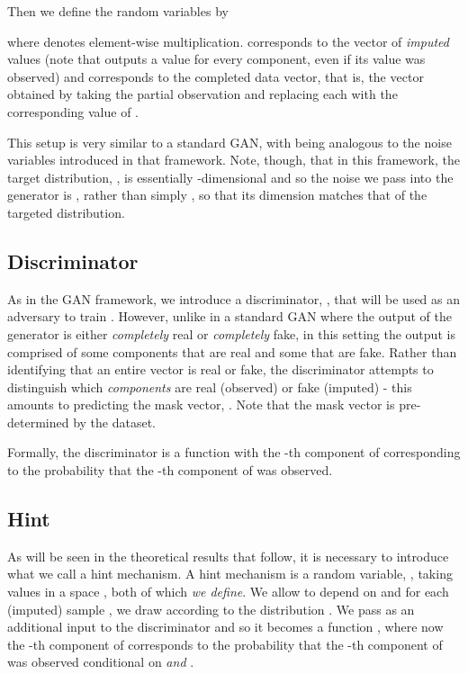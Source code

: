 \documentclass{article}
\begin{document}
Then we define the random variables  by

where  denotes element-wise multiplication.  corresponds to the vector of {\em imputed} values (note that  outputs a value for every component, even if its value was observed) and  corresponds to the completed data vector, that is, the vector obtained by taking the partial observation  and replacing each  with the corresponding value of .

This setup is very similar to a standard GAN, with  being analogous to the noise variables introduced in that framework. Note, though, that in this framework, the target distribution, , is essentially -dimensional and so the noise we pass into the generator is , rather than simply , so that its dimension matches that of the targeted distribution.

\subsection{Discriminator}
As in the GAN framework, we introduce a discriminator, , that will be used as an adversary to train . However, unlike in a standard GAN where the output of the generator is either {\em completely} real or {\em completely} fake, in this setting the output is comprised of some components that are real and some that are fake. Rather than identifying that an entire vector is real or fake, the discriminator attempts to distinguish which {\em components} are real (observed) or fake (imputed) - this amounts to predicting the mask vector, . Note that the mask vector  is pre-determined by the dataset.

Formally, the discriminator is a function  with the -th component of  corresponding to the probability that the -th component of  was observed.

\subsection{Hint} \label{subsec:hint}
As will be seen in the theoretical results that follow, it is necessary to introduce what we call a hint mechanism. A hint mechanism is a random variable, , taking values in a space , both of which {\em we define}. We allow  to depend on  and for each (imputed) sample , we draw  according to the distribution . We pass  as an additional input to the discriminator and so it becomes a function , where now the -th component of  corresponds to the probability that the -th component of  was observed conditional on  {\em and} .
\end{document}
